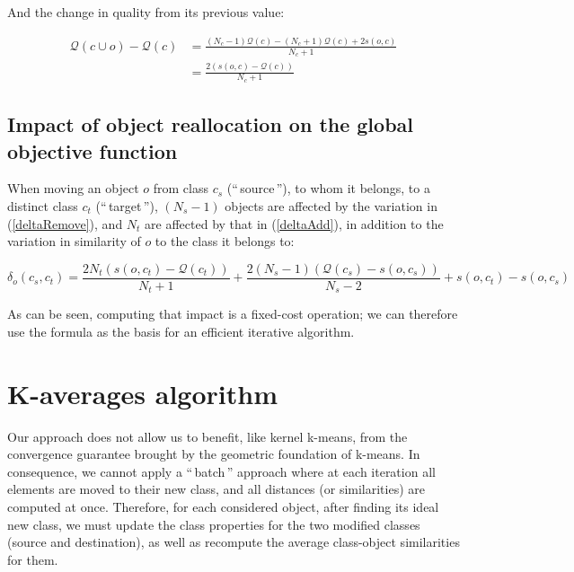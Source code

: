 \documentclass[a4paper,twoside]{article}
\newcommand{\gl}[1]{``\,#1\,''} %
\begin{document}
And the change in quality from its previous value:

\begin{equation} \label{deltaAdd}
  \begin{aligned}
    \mathcal{Q}\left(c \cup o\right) - \mathcal{Q}\left(c\right) & = \frac{(N_c-1) \mathcal{Q}(c)  - (N_c+1) \mathcal{Q}(c)  + 2s\left(o, c\right)}{N_c+1} \\
                                                                           & = \frac{2\left(s\left(o, c\right)-\mathcal{Q}(c)\right)}{N_c+1}
    \end{aligned}
\end{equation}


\subsection{Impact of object reallocation on the global objective function}

When moving an object $o$ from class $c_s$ (\gl{source}), to whom it belongs, to a
distinct class $c_t$ (\gl{target}), $(N_s-1)$ objects are affected
by the variation in (\ref{deltaRemove}), and $N_t$ are affected
by that in (\ref{deltaAdd}), in addition to the variation in similarity
of $o$ to the class it belongs to:

\begin{equation}
  \delta_o(c_s, c_t) = \frac{2N_t \left(s\left(o, c_t\right)-\mathcal{Q}(c_t)\right)}{N_t+1} + \frac{2(N_s-1)\left( \mathcal{Q}(c_s) - s\left(o, c_s\right)\right)}{N_s-2} + s(o,c_t) - s(o,c_s)
  \label{eq:impact_classnorm}
\end{equation}

As can be seen, computing that impact is a fixed-cost operation; we can therefore use the formula as the basis for an efficient iterative algorithm.

\section{K-averages algorithm}
\label{sec:algo}

Our approach does not allow us to benefit, like kernel k-means, from the convergence guarantee brought by the geometric foundation of k-means. In consequence, we cannot apply a \gl{batch} approach where at each iteration all elements are moved to their new class, and all distances (or similarities) are computed at once. Therefore, for each considered object, after finding its ideal new class, we must update the class properties for the two modified classes (source and destination), as well as recompute the average class-object similarities for them.
\end{document}
